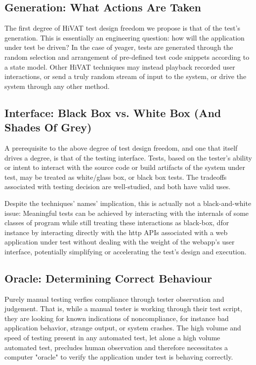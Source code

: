 \subsection{Generation: What Actions Are Taken}
The first degree of HiVAT test design freedom we propose is that of the test's generation. This is essentially an engineering question: how will the application under test be driven? In the case of yeager, tests are generated through the random selection and arrangement of pre-defined test code snippets according to a state model. Other HiVAT techniques may instead playback recorded user interactions, or send a truly random stream of input to the system, or drive the system through any other method.

\subsection{Interface: Black Box vs. White Box (And Shades Of Grey)}
A prerequisite to the above degree of test design freedom, and one that itself drives a degree, is that of the testing interface. Tests, based on the tester's ability or intent to interact with the source code or build artifacts of the system under test, may be treated as white/glass box, or black box tests. The tradeoffs associated with testing decision are well-studied, and both have valid uses.

Despite the techniques' names' implication, this is actually not a black-and-white issue: Meaningful tests can be achieved by interacting with the internals of some classes of program while still treating these interactions as black-box, dfor instance by interacting directly with the http APIs associated with a web application under test without dealing with the weight of the webapp's user interface, potentially simplifying or accelerating the test's design and execution.\citep{HoffmanTradeoffs}

\subsection{Oracle: Determining Correct Behaviour}
Purely manual testing verfies compliance through tester observation and judgement. That is, while a manual tester is working through their test script, they are looking for known indications of noncompliance, for instance bad application behavior, strange output, or system crashes. The high volume and speed of testing present in any automated test, let alone a high volume automated test, precludes human observation and therefore necessitates a computer "oracle" to verify the application under test is behaving correctly.

